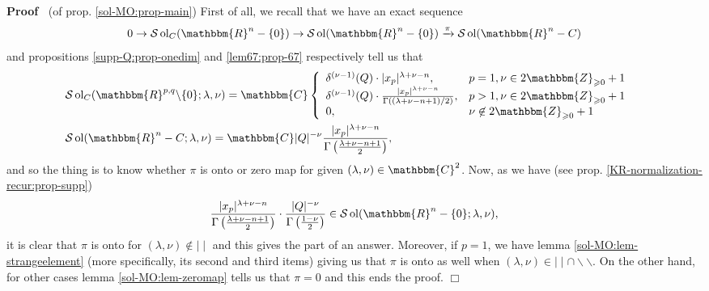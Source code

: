 \documentclass{article}
\newcommand{\nin}{\not\in}
\newcommand{\tmop}[1]{\ensuremath{\operatorname{#1}}}
\newenvironment{proof}{\noindent\textbf{Proof\ }}{\hspace*{\fill}$\Box$\medskip}
\numberwithin{definition}{section}
\numberwithin{lemma}{section}
\numberwithin{proposition}{section}
{\theorembodyfont{\rmfamily}\newtheorem{remark}{Remark}
\numberwithin{remark}{section}
}
\begin{document}
\begin{proof}
  (of prop. \ref{sol-MO:prop-main}) First of all, we recall that we have an
  exact sequence
  \[ 0 \rightarrow \mathcal{S} \tmop{ol}_C ( \mathbbm{R}^n - \{ 0 \})
     \rightarrow \mathcal{S} \tmop{ol} ( \mathbbm{R}^n - \{ 0 \})
     \xrightarrow{\pi} \mathcal{S} \tmop{ol} ( \mathbbm{R}^n - C) \]
  and propositions \ref{supp-Q:prop-onedim} and \ref{lem67:prop-67}
  respectively tell us that
  \begin{eqnarray}
    & \mathcal{S} \tmop{ol}_C ( \mathbbm{R}^{p, q} \backslash \{ 0 \} ;
    \lambda, \nu) =\mathbbm{C} \left\{ \begin{array}{ll}
      \delta^{( \nu - 1)} ( Q) \cdot | x_p |^{\lambda + \nu - n}, & p = 1, \nu
      \in 2\mathbbm{Z}_{\geqslant 0} + 1\\
      \delta^{( \nu - 1)} ( Q) \cdot \frac{| x_p |^{\lambda + \nu - n}}{\Gamma
      ( ( \lambda + \nu - n + 1) / 2)}, & p > 1, \nu \in
      2\mathbbm{Z}_{\geqslant 0} + 1\\
      0, & \nu \nin 2\mathbbm{Z}_{\geqslant 0} + 1
    \end{array} \right. &  \nonumber\\
    & \mathcal{S} \tmop{ol} ( \mathbbm{R}^n - C ; \lambda, \nu) =\mathbbm{C}
    | Q |^{- \nu} \frac{| x_p |^{\lambda + \nu - n}}{\Gamma \left(
    \frac{\lambda + \nu - n + 1}{2} \right)}, &  \nonumber
  \end{eqnarray}
  and so the thing is to know whether $\pi$ is onto or zero map for given $(
  \lambda, \nu) \in \mathbbm{C}^2$. Now, as we have (see prop.
  \ref{KR-normalization-recur:prop-supp})
  \[ \frac{| x_p |^{\lambda + \nu - n}}{\Gamma \left( \frac{\lambda + \nu - n
     + 1}{2} \right)} \cdot \frac{| Q |^{- \nu}}{\Gamma \left( \frac{1 -
     \nu}{2} \right)} \in \mathcal{S} \tmop{ol} ( \mathbbm{R}^n - \{ 0 \} ;
     \lambda, \nu), \]
  it is clear that $\pi$ is onto for $( \lambda, \nu) \nin \mid \mid$ and this
  gives the part of an answer. Moreover, if $p = 1$, we have lemma
  \ref{sol-MO:lem-strangeelement} (more specifically, its second and third
  items) giving us that $\pi$ is onto as well when $( \lambda, \nu) \in \mid
  \mid \cap \backslash\backslash$. On the other hand, for other cases lemma
  \ref{sol-MO:lem-zeromap} tells us that $\pi = 0$ and this ends the proof.
\end{proof}
\end{document}
